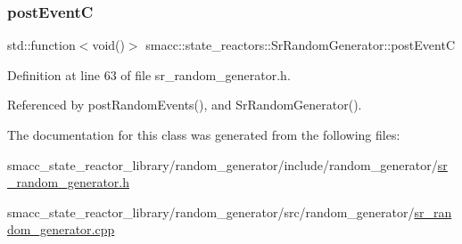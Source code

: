 \mbox{\label{classsmacc_1_1state__reactors_1_1SrRandomGenerator_a1aeb07de7b52a9f5811e5f60444731a0}} 
\subsubsection{\texorpdfstring{post\+EventC}{postEventC}}
{\footnotesize\ttfamily std\+::function$<$void()$>$ smacc\+::state\+\_\+reactors\+::\+Sr\+Random\+Generator\+::post\+EventC\hspace{0.3cm}{\ttfamily [private]}}



Definition at line 63 of file sr\+\_\+random\+\_\+generator.\+h.



Referenced by post\+Random\+Events(), and Sr\+Random\+Generator().



The documentation for this class was generated from the following files\+:\begin{DoxyCompactItemize}
\item 
smacc\+\_\+state\+\_\+reactor\+\_\+library/random\+\_\+generator/include/random\+\_\+generator/\hyperlink{sr__random__generator_8h}{sr\+\_\+random\+\_\+generator.\+h}\item 
smacc\+\_\+state\+\_\+reactor\+\_\+library/random\+\_\+generator/src/random\+\_\+generator/\hyperlink{sr__random__generator_8cpp}{sr\+\_\+random\+\_\+generator.\+cpp}\end{DoxyCompactItemize}
